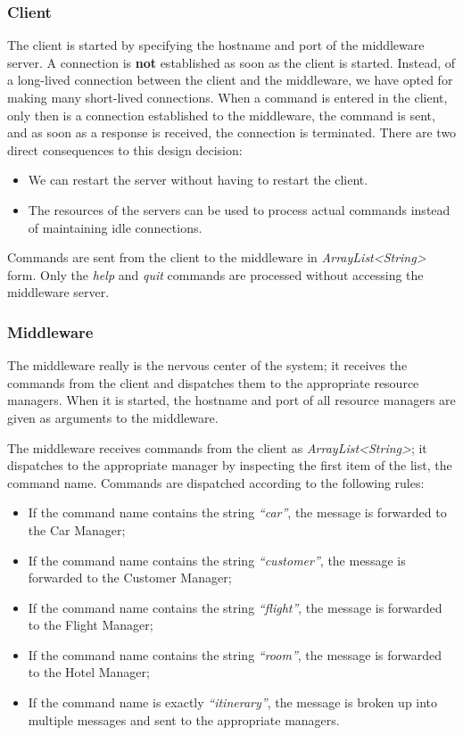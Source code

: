 \documentclass[11pt]{article}
\begin{document}
\subsubsection{Client}

The client is started by specifying the hostname and port of the
middleware server.  A connection is {\bf not} established as soon as
the client is started.  Instead, of a long-lived connection between
the client and the middleware, we have opted for making many
short-lived connections.  When a command is entered in the client,
only then is a connection established to the middleware, the command
is sent, and as soon as a response is received, the connection is
terminated.  There are two direct consequences to this design
decision:

\begin{itemize}
\item We can restart the server without having to restart the client.
\item The resources of the servers can be used to process actual
  commands instead of maintaining idle connections.
\end{itemize}

Commands are sent from the client to the middleware in
{\it ArrayList<String>} form.  Only the {\it help} and {\it quit}
commands are processed without accessing the middleware server.

\subsubsection{Middleware}

The middleware really is the nervous center of the system; it receives
the commands from the client and dispatches them to the appropriate
resource managers.  When it is started, the hostname and port of all
resource managers are given as arguments to the middleware.

The middleware receives commands from the client as {\it
  ArrayList<String>}; it dispatches to the appropriate manager by
inspecting the first item of the list, the command name.  Commands are
dispatched according to the following rules:


\begin{itemize}
\item If the command name contains the string {\it ``car''}, the
  message is forwarded to the Car Manager;
\item If the command name contains the string {\it ``customer''}, the
  message is forwarded to the Customer Manager;
\item If the command name contains the string {\it ``flight''}, the
  message is forwarded to the Flight Manager;
\item If the command name contains the string {\it ``room''}, the
  message is forwarded to the Hotel Manager;
\item If the command name is exactly {\it ``itinerary''}, the message
  is broken up into multiple messages and sent to the appropriate
  managers.
\end{itemize}
\end{document}
